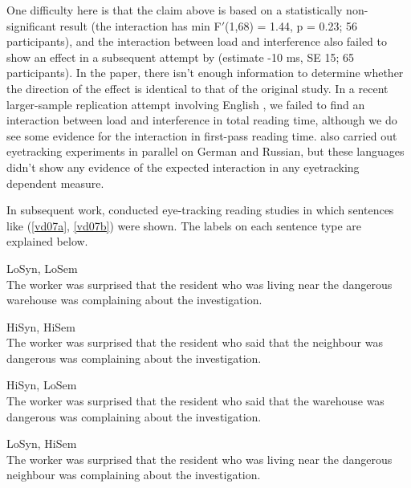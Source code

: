 \documentclass{cambridge7A}\usepackage[]{graphicx}\usepackage[]{color}
\begin{document}
One difficulty here is that the claim above is based on a statistically non-significant result (the interaction has min F$'$(1,68) = 1.44, p = 0.23; 56 participants), 
and the interaction between load and interference also failed to show an effect in a subsequent attempt by \cite{van2014low} (estimate -10 ms, SE 15; 65 participants). 
In the \cite{van2014low} paper, there isn't enough information to determine whether the direction of the effect is identical to that of the original study. In a recent larger-sample replication attempt involving English \citep{MertzenEtAlAMLaP2019}, we failed to find an interaction between load and interference in total reading time, although we do see some evidence for the interaction in first-pass reading time. \cite{MertzenEtAlAMLaP2019} also carried out eyetracking experiments in parallel on  German and Russian, but these languages didn't show any evidence of the expected interaction in any eyetracking dependent measure. 

 In subsequent work, \cite{VanDyke2007} conducted eye-tracking reading studies in which sentences like (\ref{vd07a},   \ref{vd07b}) were shown. The labels on each sentence type are explained below.

\begin{exe}
\ex \label{vd07a}
\begin{xlist}
\item LoSyn, LoSem\\
The worker was surprised that the resident who was living near the dangerous warehouse was complaining about the investigation.
\item HiSyn, HiSem\\
The worker was surprised that the resident who said that the neighbour was dangerous was complaining about the investigation.
\end{xlist}
\end{exe}

\begin{exe}
\ex\label{vd07b}
\begin{xlist}
\item HiSyn, LoSem\\
The worker was surprised that the resident who said that the warehouse was dangerous was complaining about the investigation.
\item LoSyn, HiSem\\
The worker was surprised that the resident who was living near the dangerous neighbour was complaining about the investigation.
\end{xlist}
\end{exe}
\end{document}

